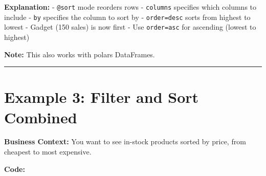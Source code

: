 \documentclass[
  letterpaper,
]{scrbook}
\begin{document}
\textbf{Explanation:} -
\texttt{\textquotesingle{}@sort\textquotesingle{}} mode reorders rows -
\texttt{columns} specifies which columns to include - \texttt{by}
specifies the column to sort by -
\texttt{order=\textquotesingle{}desc\textquotesingle{}} sorts from
highest to lowest - Gadget (150 sales) is now first - Use
\texttt{order=\textquotesingle{}asc\textquotesingle{}} for ascending
(lowest to highest)

\textbf{Note:} This also works with polars DataFrames.

\begin{center}\rule{0.5\linewidth}{0.5pt}\end{center}

\section{Example 3: Filter and Sort
Combined}\label{example-3-filter-and-sort-combined}

\textbf{Business Context:} You want to see in-stock products sorted by
price, from cheapest to most expensive.

\textbf{Code:}
\end{document}

